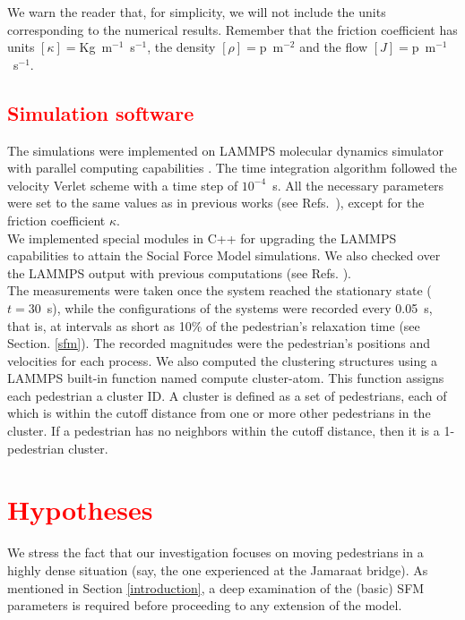 \documentclass[preprint,12pt]{elsarticle}
\begin{document}
We warn the reader that, for simplicity, we will not include the units 
corresponding to the numerical results. Remember that the friction coefficient 
has units $\left [ \kappa \right]=$Kg~m$^{-1}$~s$^{-1}$, the density $\left [ 
\rho \right]=$p~m$^{-2}$ and the flow $\left [ J \right 
]=$p~m$^{-1}$~s$^{-1}$.\\

\subsection{\label{software}\textcolor{red}{Simulation software}}

The simulations were implemented on LAMMPS molecular dynamics 
simulator with parallel computing capabilities \cite{plimpton}. The time 
integration algorithm followed the velocity Verlet scheme with a time step of 
$10^{-4}$~s. All the necessary parameters were set to the same values as in 
previous works (see Refs.~\cite{Dorso5,sticco}), except for the friction 
coefficient $\kappa$. \\

We implemented special modules in C++ for upgrading the LAMMPS 
capabilities to attain the Social Force Model simulations. We also checked over 
the LAMMPS output with previous computations (see Refs. \cite{Dorso2, 
Dorso1,Dorso3, Dorso4,Dorso6}).\\

The measurements were taken once the system reached the 
stationary state ($t=30$~s), while the configurations of the systems were 
recorded every 0.05~s, that is, at intervals as short as 10\% of the 
pedestrian’s relaxation time (see Section. \ref{sfm}). The recorded magnitudes 
were the pedestrian’s positions and velocities for each process. We also 
computed the clustering structures using a LAMMPS built-in function 
named compute cluster-atom. This function assigns each pedestrian a cluster ID.
A cluster is defined as a set of pedestrians, each of which is within the cutoff
distance from one or more other pedestrians in the cluster. 
If a pedestrian has no neighbors within the cutoff distance, then it is a 1-pedestrian cluster.\\




\section{\label{Hypotheses} \textcolor{red}{Hypotheses}}

We stress the fact that our investigation focuses on moving
pedestrians in a highly dense situation (say, the one experienced at
the Jamaraat bridge). As mentioned in Section \ref{introduction}, a deep
examination of the (basic) SFM parameters is required before
proceeding to any extension of the model.\\
\end{document}
